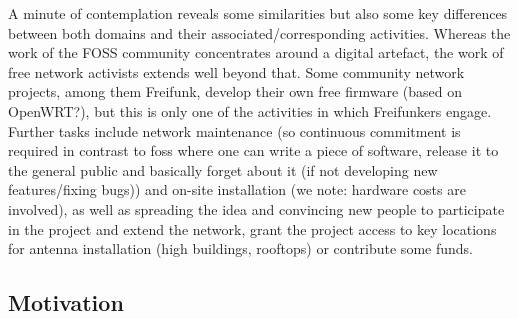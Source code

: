 \begin{comment}
* freie dezentrale Kommunikationsinfrastruktur, in den Händen der Community
* freie Software (die Routerfirmware)
* freier Zugang zum Netzwerk
* Informationen werden durchgereicht ohne diese zu verändern oder priorisieren
\end{comment}

A minute of contemplation reveals some similarities but also some key differences between both domains and their associated/corresponding activities.
Whereas the work of the FOSS community concentrates around a digital artefact, the work of free network activists extends well beyond that.
Some community network projects, among them Freifunk, develop their own free firmware (based on OpenWRT?), but this is only one of the activities in which Freifunkers engage.
Further tasks include network maintenance (so continuous commitment is required in contrast to foss where one can write a piece of software, release it to the general public and basically forget about it (if not developing new features/fixing bugs)) and on-site installation (we note: hardware costs are involved), as well as spreading the idea and convincing new people to participate in the project and extend the network, grant the project access to key locations for antenna installation (high buildings, rooftops) or contribute some funds.

\subsection{Motivation}

\begin{comment}
> To be motivated means to be moved to do something.

> Our own approach focuses primarily on psychological needs—namely,
> the innate needs for competence, autonomy, and relatedness
Ryan and Deci 2000

## *intrinsische* vs *extrinsische* Motivation

einfache Unterscheidung:
* intrinsisch: interessant/spannend/unterhaltsam an sich
* extrinsisch: führt zu einem bestimmten Ergebnis

aber
* Extrinsische Motivation != Extrinsische Motivation

Kontinuum:
~ Amotivation $\rightarrow$ External Regulation $\rightarrow$ Introjection $\rightarrow$ Identification $\rightarrow$ Integration $\rightarrow$ Intrinsic Motivation
~ $\rightarrow$ mit steigendem Gefühl für Autonomie und Kompetenz verinnerlicht man die Aufgabe und ist auch motivierter, diese zu erledigen
\end{comment}

